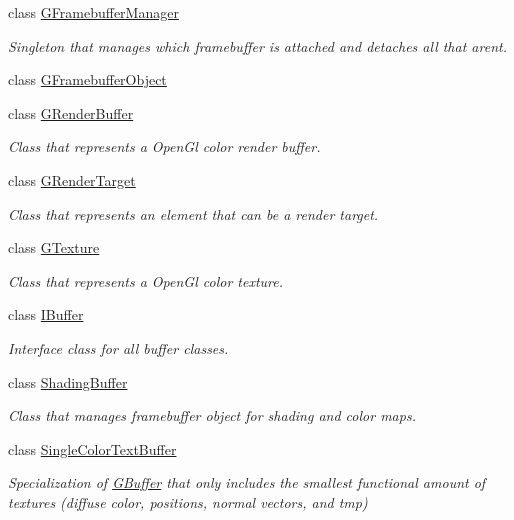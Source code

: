 \begin{DoxyCompactItemize}
class \mbox{\hyperlink{class_geometry_engine_1_1_geometry_buffer_1_1_g_framebuffer_manager}{G\+Framebuffer\+Manager}}
\begin{DoxyCompactList}\small\item\em Singleton that manages which framebuffer is attached and detaches all that aren\textquotesingle{}t. \end{DoxyCompactList}\item 
class \mbox{\hyperlink{class_geometry_engine_1_1_geometry_buffer_1_1_g_framebuffer_object}{G\+Framebuffer\+Object}}
\item 
class \mbox{\hyperlink{class_geometry_engine_1_1_geometry_buffer_1_1_g_render_buffer}{G\+Render\+Buffer}}
\begin{DoxyCompactList}\small\item\em Class that represents a Open\+Gl color render buffer. \end{DoxyCompactList}\item 
class \mbox{\hyperlink{class_geometry_engine_1_1_geometry_buffer_1_1_g_render_target}{G\+Render\+Target}}
\begin{DoxyCompactList}\small\item\em Class that represents an element that can be a render target. \end{DoxyCompactList}\item 
class \mbox{\hyperlink{class_geometry_engine_1_1_geometry_buffer_1_1_g_texture}{G\+Texture}}
\begin{DoxyCompactList}\small\item\em Class that represents a Open\+Gl color texture. \end{DoxyCompactList}\item 
class \mbox{\hyperlink{class_geometry_engine_1_1_geometry_buffer_1_1_i_buffer}{I\+Buffer}}
\begin{DoxyCompactList}\small\item\em Interface class for all buffer classes. \end{DoxyCompactList}\item 
class \mbox{\hyperlink{class_geometry_engine_1_1_geometry_buffer_1_1_shading_buffer}{Shading\+Buffer}}
\begin{DoxyCompactList}\small\item\em Class that manages framebuffer object for shading and color maps. \end{DoxyCompactList}\item 
class \mbox{\hyperlink{class_geometry_engine_1_1_geometry_buffer_1_1_single_color_text_buffer}{Single\+Color\+Text\+Buffer}}
\begin{DoxyCompactList}\small\item\em Specialization of \mbox{\hyperlink{class_geometry_engine_1_1_geometry_buffer_1_1_g_buffer}{G\+Buffer}} that only includes the smallest functional amount of textures (diffuse color, positions, normal vectors, and tmp) \end{DoxyCompactList}\end{DoxyCompactItemize}
